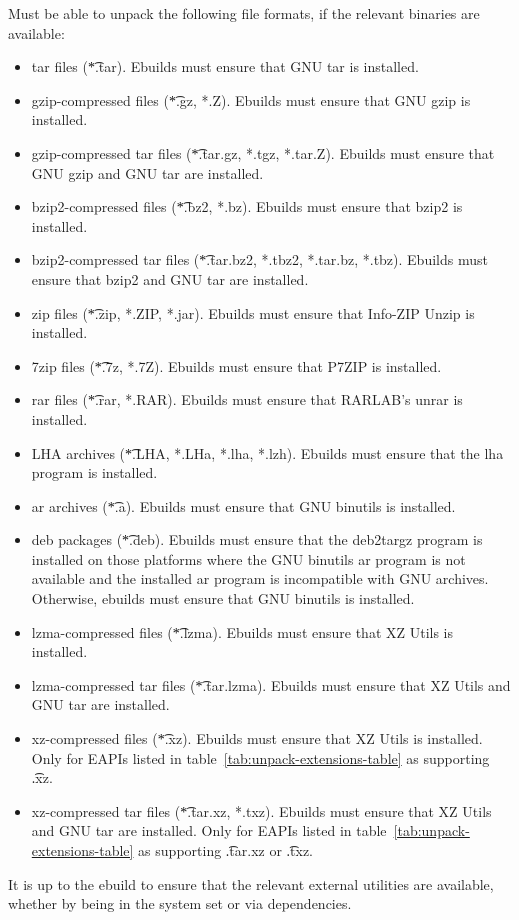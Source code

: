 \begin{description}
     Must be able to unpack the following file formats, if the
    relevant binaries are available:
    \begin{itemize}
    \item tar files (\t{*.tar}). Ebuilds must ensure that GNU tar is installed.
    \item gzip-compressed files (\t{*.gz, *.Z}). Ebuilds must ensure that GNU gzip is installed.
    \item gzip-compressed tar files (\t{*.tar.gz, *.tgz, *.tar.Z}). Ebuilds must ensure that
        GNU gzip and GNU tar are installed.
    \item bzip2-compressed files (\t{*.bz2, *.bz}). Ebuilds must ensure that bzip2 is installed.
    \item bzip2-compressed tar files (\t{*.tar.bz2, *.tbz2, *.tar.bz, *.tbz}). Ebuilds must ensure
        that bzip2 and GNU tar are installed.
    \item zip files (\t{*.zip, *.ZIP, *.jar}). Ebuilds must ensure that Info-ZIP Unzip is installed.
    \item 7zip files (\t{*.7z, *.7Z}). Ebuilds must ensure that P7ZIP is installed.
    \item rar files (\t{*.rar, *.RAR}). Ebuilds must ensure that RARLAB's unrar is installed.
    \item LHA archives (\t{*.LHA, *.LHa, *.lha, *.lzh}). Ebuilds must ensure that the lha program is
        installed.
    \item ar archives (\t{*.a}). Ebuilds must ensure that GNU binutils is installed.
    \item deb packages (\t{*.deb}). Ebuilds must ensure that the deb2targz program is installed on
        those platforms where the GNU binutils ar program is not available and the installed ar
        program is incompatible with GNU archives. Otherwise, ebuilds must ensure that GNU binutils
        is installed.
    \item lzma-compressed files (\t{*.lzma}). Ebuilds must ensure that XZ Utils is installed.
    \item lzma-compressed tar files (\t{*.tar.lzma}). Ebuilds must ensure that XZ Utils and GNU tar
        are installed.
    \item xz-compressed files (\t{*.xz}). Ebuilds must ensure that XZ Utils is installed. Only for
        EAPIs listed in table~\ref{tab:unpack-extensions-table} as supporting \t{.xz}.
    \item xz-compressed tar files (\t{*.tar.xz, *.txz}). Ebuilds must ensure that XZ Utils and
        GNU tar are installed. Only for EAPIs listed in table~\ref{tab:unpack-extensions-table} as
        supporting \t{.tar.xz} or \t{.txz}.
    \end{itemize}
    It is up to the ebuild to ensure that the relevant external utilities are available, whether by
    being in the system set or via dependencies.


\end{description}
